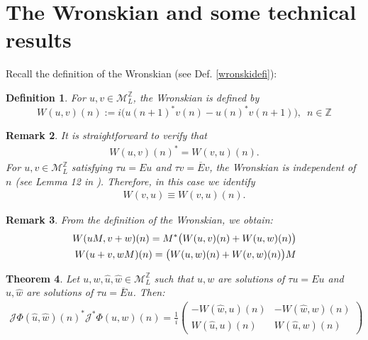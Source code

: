 \documentclass[12pt,oneside,onecolumn,open]{article}
\newtheorem{teo}{Theorem}[section]
\newtheorem{defi}[teo]{Definition}
\newtheorem{obs}[teo]{Remark}
\begin{document}
\section{The Wronskian and some technical results  }\label{sectionWR}

Recall the definition of the Wronskian (see Def. \ref{wronskidefi}):

\begin{defi}
    For $u,v\in \mathcal{M}_{L}^{\mathbb{Z}}$, the Wronskian is defined by 
    \begin{equation}
        W(u,v)(n):=i\big(u(n+1)^{*}v(n)-u(n)^{*}v(n+1)\big),\,\,\,n\in \mathbb{Z}
    \end{equation}
    \end{defi}
    \begin{obs}\label{ND}
It is straightforward to verify that 
\begin{align} \label{symw}
W(u,v)(n)^{*} = W(v,u)(n).
\end{align}
For $u, v \in \mathcal{M}_{L}^{\mathbb{Z}}$ satisfying $\tau u = Eu$ and $\tau v = \overline{E}v$, the Wronskian is independent of $n$ (see Lemma 12 in \cite{MR4192212}). Therefore, in this case we identify
\begin{align}
W(v,u) \equiv W(v,u)(n).
\end{align}
\end{obs}
   \begin{obs}
      From the definition of the Wronskian, we obtain:
\begin{align}\label{WProp}
    W(uM, v + w)(n) = M^{*} \big( W(u, v)(n) + W(u, w)(n) \big) \\\notag
    W(u + v, w M)(n) = \big( W(u, w)(n) + W(v, w)(n) \big) M
\end{align}
   \end{obs}
\begin{teo}
    Let $u, w, \hat{u}, \hat{w} \in \mathcal{M}_L^{\mathbb{Z}}$ such that $u, w$ are solutions of $\tau u = Eu $ and $\hat{u}, \hat{w}$ are solutions of $\tau u = \overline{E}u $. Then:
    \begin{align}\label{PhiW}
        \mathcal{J}\Phi(\hat{u}, \hat{w})(n)^{*}\mathcal{J}^{*}\Phi(u, w)(n) = \frac{1}{i}
        \begin{pmatrix}
            -W(\hat{w}, u)(n) & -W(\hat{w}, w)(n) \\
            W(\hat{u}, u)(n) & W(\hat{u}, w)(n)
        \end{pmatrix}
    \end{align}
\end{teo}
\end{document}

